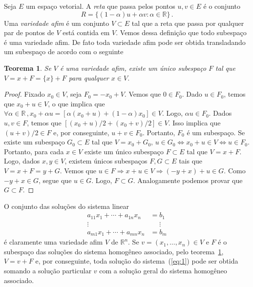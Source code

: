 \documentclass[12pt,a4paper]{article}
\newcommand{\R}{\mathbb{R}}
\newtheorem{thm}{Teorema}[section]
\theoremstyle{definition}
\begin{document}
Seja $E$ um espaço vetorial. A \textit{reta} que passa pelos pontos
$u,v\in E$ é o conjunto
$$R=\{(1-\alpha)u+\alpha v:\alpha\in \R\}\,.$$
Uma \textit{variedade afim} é um conjunto $V\subset E$ tal que a reta
que passa por qualquer par de pontos de $V$ está contida em $V$. Vemos
dessa definição que todo subespaço é uma variedade afim. De fato toda
variedade afim pode ser obtida transladando um subespaço de acordo com
o seguinte

\begin{thm}
  \label{thm:1}
  Se $V$ é uma variedade afim, existe um único subespaço $F$ tal que
  $V=x+F=\{x\}+F$ para qualquer $x\in V$.
\end{thm}
\begin{proof}
  Fixado $x_0\in V$, seja $F_0=-x_0+V$. Vemos que $0\in F_0$. Dado
  $u\in F_0$, temos que $x_0+u\in V$, o que implica que
  $\forall \alpha\in\R\,, x_0+\alpha
  u=[\alpha(x_0+u)+(1-\alpha)x_0]\in V$. Logo, $\alpha u\in
  F_0$. Dados $u,v\in F$, temos que $[(x_0+u)/2+(x_0+v)/2]\in V$. Isso
  implica que $(u+v)/2\in F$ e, por conseguinte, $u+v\in
  F_0$. Portanto, $F_0$ é um subespaço. Se existe um subespaço
  $G_0\subset E$ tal que $V=x_0+G_0$,
  $u\in G_0\Leftrightarrow x_0+u\in V\Leftrightarrow u\in
  F_0$. Portanto, para cada $x\in V$ existe um único subespaço
  $F\subset E$ tal que $V=x+F$. Logo, dados $x,y\in V$, existem únicos
  subespaços $F,G\subset E$ tais que $V=x+F=y+G$. Vemos que
  $u\in F\Rightarrow x+u\in V\Rightarrow (-y+x)+u\in G$. Como
  $-y+x\in G$, segue que $u\in G$. Logo, $F\subset G$. Analogamente
  podemos provar que $G\subset F$.
\end{proof}

O conjunto das soluções do sistema linear
\begin{equation}
  \label{eq:1}
  \begin{split}
    a_{11}x_1+\cdots+a_{1n}x_n&=b_1\\
    \vdots\qquad\qquad&\quad\,\,\vdots\\
    a_{m1}x_1+\cdots+a_{mn}x_n&=b_m
  \end{split}
\end{equation}
é claramente uma variedade afim $V$ de $\R^n$. Se
$v=(x_1,\ldots,x_n)\in V$ e $F$ é o subespaço das soluções do sistema
homogêneo associado, pelo teorema~\ref{thm:1}, $V=v+F$ e, por
conseguinte, toda solução do sistema~(\ref{eq:1}) pode ser obtida
somando a solução particular $v$ com a solução geral do sistema
homogêneo associado.

\end{document}
